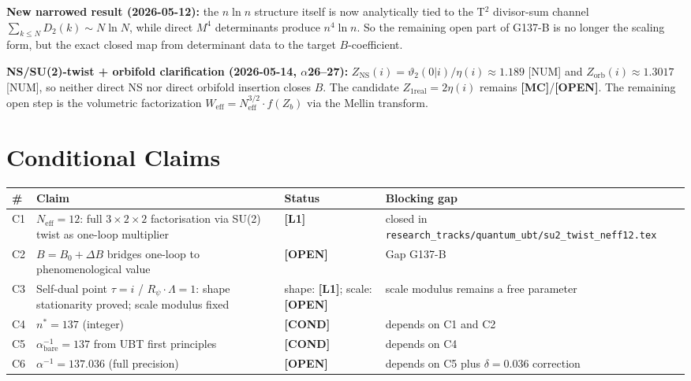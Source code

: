 \documentclass[12pt,a4paper]{article}
\theoremstyle{definition}
\theoremstyle{remark}
\newcommand{\Lone}{\textbf{[L1]}}
\newcommand{\MC}{\textbf{[MC]}}
\newcommand{\COND}{\textbf{[COND]}}
\newcommand{\OPEN}{\textbf{[OPEN]}}
\begin{document}
\medskip
\noindent\textbf{New narrowed result (2026-05-12):}
the \(n\ln n\) structure itself is now analytically tied to the T$^2$ divisor-sum channel
\(\sum_{k\le N}D_2(k)\sim N\ln N\), while direct \(M^4\) determinants produce \(n^4\ln n\).
So the remaining open part of G137-B is no longer the scaling form, but the exact
closed map from determinant data to the target \(B\)-coefficient.

\medskip
\noindent\textbf{NS/SU(2)-twist + orbifold clarification (2026-05-14, \(\alpha\)26--27):}
$Z_{\mathrm{NS}}(i)=\vartheta_2(0|i)/\eta(i)\approx1.189$ [NUM] and
$Z_{\mathrm{orb}}(i)\approx1.3017$ [NUM], so neither direct NS nor direct
orbifold insertion closes $B$. The candidate $Z_{1\mathrm{real}}=2\eta(i)$
remains \MC/\OPEN. The remaining open step is the volumetric factorization
\(W_{\mathrm{eff}} = N_{\mathrm{eff}}^{3/2}\cdot f(Z_b)\) via the Mellin transform.


\section{Conditional Claims}
\label{sec:conditional}

\begin{center}
\begin{tabular}{p{1cm} p{5.5cm} p{2cm} p{5cm}}
\toprule
\textbf{\#} & \textbf{Claim} & \textbf{Status} & \textbf{Blocking gap} \\
\midrule
C1 & $N_{\mathrm{eff}} = 12$: full $3\times2\times2$ factorisation via SU(2) twist
  as one-loop multiplier & \Lone &
  closed in \texttt{research\_tracks/quantum\_ubt/su2\_twist\_neff12.tex} \\[4pt]
C2 & $B = B_0 + \Delta B$ bridges one-loop to phenomenological value & \OPEN &
  Gap G137-B \\[4pt]
C3 & Self-dual point $\tau=i$ / $R_\psi\cdot\Lambda=1$: shape stationarity
  proved; scale modulus fixed & shape: \Lone; scale: \OPEN &
  scale modulus remains a free parameter \\[4pt]
C4 & $n^* = 137$ (integer) & \COND &
  depends on C1 and C2 \\[4pt]
C5 & $\alpha^{-1}_{\mathrm{bare}} = 137$ from UBT first principles & \COND &
  depends on C4 \\[4pt]
C6 & $\alpha^{-1} = 137.036$ (full precision) & \OPEN &
  depends on C5 plus $\delta = 0.036$ correction \\[4pt]
\bottomrule
\end{tabular}
\end{center}
\end{document}
